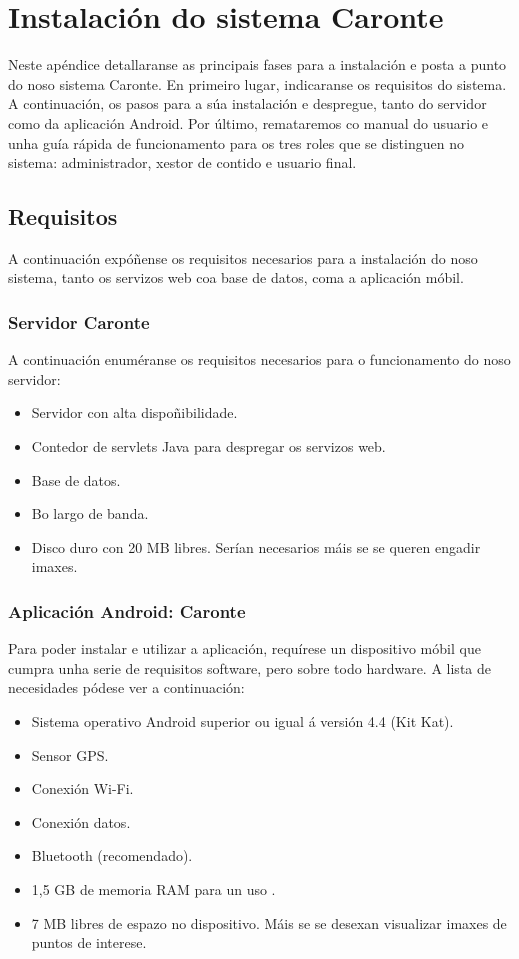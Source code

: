 \chapter{Instalación do sistema Caronte}

Neste apéndice detallaranse as principais fases para a instalación e posta a punto do noso sistema Caronte.
En primeiro lugar, indicaranse os requisitos do sistema. A continuación, os pasos para a súa instalación e despregue, tanto do servidor como da aplicación Android.
Por último, remataremos co manual do usuario e unha guía rápida de funcionamento para os tres roles que se distinguen no sistema: administrador, xestor de contido e usuario final.

\section{Requisitos}
A continuación expóñense os requisitos necesarios para a instalación do noso sistema, tanto os servizos web coa base de datos, coma a aplicación móbil.

\subsection{Servidor Caronte}
A continuación enuméranse os requisitos necesarios para o funcionamento do noso servidor:

\begin{itemize}
	\item Servidor con alta dispoñibilidade.
	\item Contedor de servlets Java para despregar os servizos web.
	\item Base de datos.
	\item Bo largo de banda.
	\item Disco duro con 20 MB libres. Serían necesarios máis se se queren engadir imaxes.
\end{itemize}

\subsection{Aplicación Android: Caronte}
Para poder instalar e utilizar a aplicación, requírese un dispositivo móbil que cumpra unha serie de requisitos software, pero sobre todo hardware. A lista de necesidades pódese ver a continuación:

\begin{itemize}
	\item Sistema operativo Android superior ou igual á versión 4.4 (Kit Kat).
	\item Sensor GPS.
	\item Conexión Wi-Fi.
	\item Conexión datos.
	\item Bluetooth (recomendado).
	\item 1,5 GB de memoria RAM para un uso .
	\item 7 MB libres de espazo no dispositivo. Máis se se desexan visualizar imaxes de puntos de interese.
\end{itemize}

